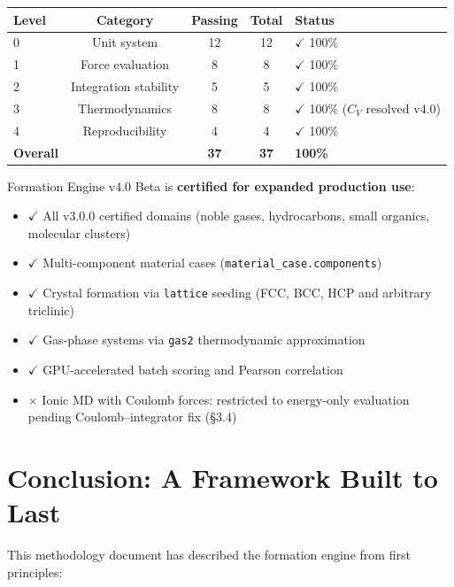 \documentclass[11pt]{article}
\begin{document}
\begin{center}
\begin{tabular}{lcccl}
\toprule
Level & Category & Passing & Total & Status \\
\midrule
0 & Unit system        & 12 & 12 & $\checkmark$ 100\% \\
1 & Force evaluation   &  8 &  8 & $\checkmark$ 100\% \\
2 & Integration stability & 5 &  5 & $\checkmark$ 100\% \\
3 & Thermodynamics     &  8 &  8 & $\checkmark$ 100\% ($C_V$ resolved v4.0) \\
4 & Reproducibility    &  4 &  4 & $\checkmark$ 100\% \\
\midrule
\textbf{Overall} & & \textbf{37} & \textbf{37} & \textbf{100\%} \\
\bottomrule
\end{tabular}
\end{center}

Formation Engine v4.0 Beta is \textbf{certified for expanded production use}:

\begin{itemize}
  \item $\checkmark$ All v3.0.0 certified domains (noble gases, hydrocarbons,
        small organics, molecular clusters)
  \item $\checkmark$ Multi-component material cases
        (\texttt{material\_case.components})
  \item $\checkmark$ Crystal formation via \texttt{lattice} seeding
        (FCC, BCC, HCP and arbitrary triclinic)
  \item $\checkmark$ Gas-phase systems via \texttt{gas2} thermodynamic
        approximation
  \item $\checkmark$ GPU-accelerated batch scoring and Pearson correlation
  \item $\times$ Ionic MD with Coulomb forces: restricted to
        energy-only evaluation pending Coulomb--integrator fix (\S{}3.4)
\end{itemize}

\section{Conclusion: A Framework Built to Last}

This methodology document has described the formation engine from first principles:
\end{document}
